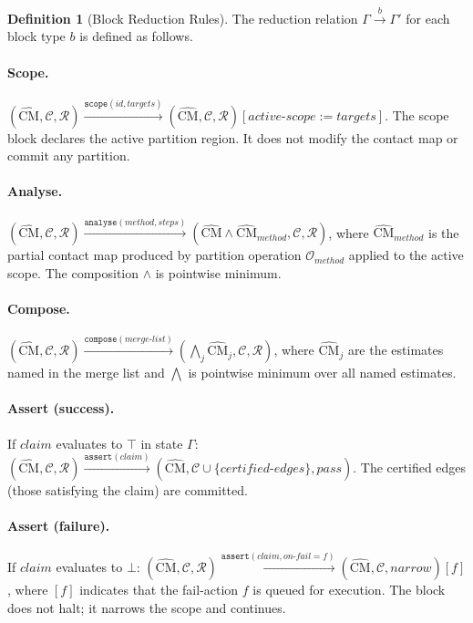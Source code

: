 \documentclass[12pt,a4paper,twocolumn]{article}
\theoremstyle{plain}
\theoremstyle{definition}
\newtheorem{definition}[theorem]{Definition}
\theoremstyle{remark}
\newcommand{\CM}{\mathrm{CM}}
\begin{document}
\begin{definition}[Block Reduction Rules]
\label{def:reduction-rules}
The reduction relation $\Gamma \xrightarrow{b} \Gamma'$ for each block
type $b$ is defined as follows.

\paragraph{Scope.}
$(\hat{\CM}, \mathcal{C}, \mathcal{R})
  \xrightarrow{\texttt{scope}(id, \textit{targets})}
  (\hat{\CM}, \mathcal{C}, \mathcal{R})[\textit{active-scope} := \textit{targets}]$.
The scope block declares the active partition region.  It does not modify the
contact map or commit any partition.

\paragraph{Analyse.}
$(\hat{\CM}, \mathcal{C}, \mathcal{R})
  \xrightarrow{\texttt{analyse}(\mathit{method}, \textit{steps})}
  (\hat{\CM} \wedge \hat{\CM}_{\mathit{method}}, \mathcal{C}, \mathcal{R})$,
where $\hat{\CM}_{\mathit{method}}$ is the partial contact map produced by
partition operation $\mathcal{O}_{\mathit{method}}$ applied to the active
scope.  The composition $\wedge$ is pointwise minimum.

\paragraph{Compose.}
$(\hat{\CM}, \mathcal{C}, \mathcal{R})
  \xrightarrow{\texttt{compose}(\textit{merge-list})}
  (\bigwedge_j \hat{\CM}_j, \mathcal{C}, \mathcal{R})$,
where $\hat{\CM}_j$ are the estimates named in the merge list and $\bigwedge$
is pointwise minimum over all named estimates.

\paragraph{Assert (success).}
If $\textit{claim}$ evaluates to $\top$ in state $\Gamma$:
$(\hat{\CM}, \mathcal{C}, \mathcal{R})
  \xrightarrow{\texttt{assert}(\textit{claim})}
  (\hat{\CM}, \mathcal{C} \cup \{\textit{certified-edges}\}, \textit{pass})$.
The certified edges (those satisfying the claim) are committed.

\paragraph{Assert (failure).}
If $\textit{claim}$ evaluates to $\bot$:
$(\hat{\CM}, \mathcal{C}, \mathcal{R})
  \xrightarrow{\texttt{assert}(\textit{claim},\textit{on-fail}=f)}
  (\hat{\CM}, \mathcal{C}, \textit{narrow})[f]$,
where $[f]$ indicates that the fail-action $f$ is queued for execution.
The block does not halt; it narrows the scope and continues.


\end{definition}
\end{document}
